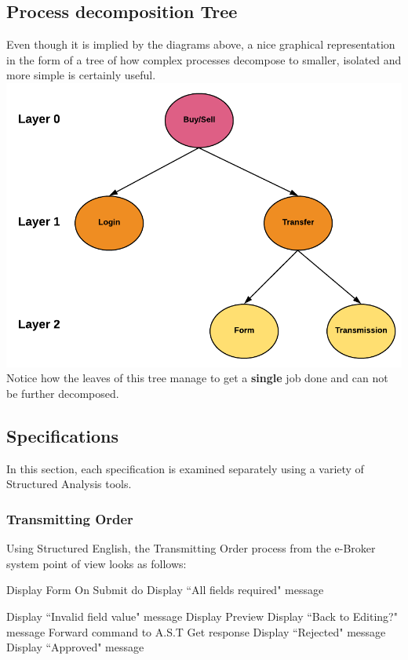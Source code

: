 \documentclass{article}
\begin{document}
\subsection{Process decomposition Tree}
Even though it is implied by the diagrams above, a nice graphical representation in the form of a tree
of how complex processes decompose to smaller, isolated and more simple is certainly useful.
\hspace*{20mm}\includegraphics[scale=0.8]{dataflow_3.png}\\

Notice how the leaves of this tree manage to get a \textbf{single} job done and can not be further decomposed. 

\subsection{Specifications}
In this section, each specification is examined separately using a variety of Structured Analysis tools. 

\subsubsection{Transmitting Order}
Using Structured English, the Transmitting Order process from the e-Broker system point of view looks as follows:\\
\begin{algorithmic}[H]
  	\STATE Display Form
  	\STATE On Submit do
  		\STATE Display ``All fields required" message
   
  		\STATE Display ``Invalid field value" message
  	\ELSE
  		\STATE Display Preview
  		\STATE Display ``Back to Editing?" message
  	\ENDIF
 \ENDWHILE
 \STATE Forward command to A.S.T
 \STATE Get response
  	\STATE Display ``Rejected" message
 \ELSE
  	\STATE Display ``Approved" message
 \ENDIF

\end{algorithmic}
\end{document}
